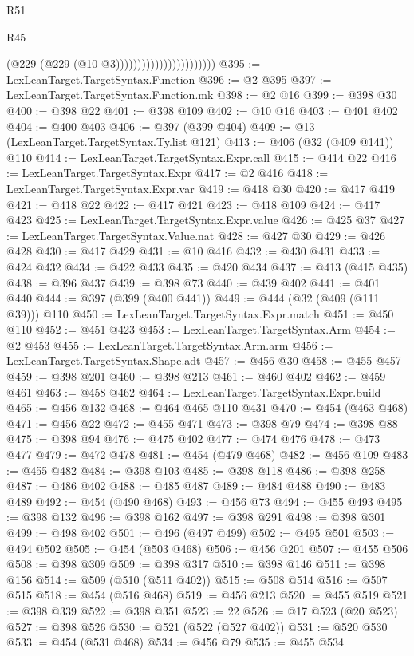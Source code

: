 \begin{lexlean}{R51}
\begin{lexlean}{R45}
\begin{coremodule}
{{{{{{{{{{{{{{{{{{{{{{{{{{{{{{{{{{{{{{{{{{{{{{{{{{{{{{{{{{{{{{{{{{{{{{{{{{{{{{{{{{{{{{{{{{{                                            (@229 (@229 (@10 @3)))))))))))))))))))))))
@395 := LexLeanTarget.TargetSyntax.Function
@396 := @2 @395
@397 := LexLeanTarget.TargetSyntax.Function.mk
@398 := @2 @16
@399 := @398 @30
@400 := @398 @22
@401 := @398 @109
@402 := @10 @16
@403 := @401 @402
@404 := @400 @403
@406 := @397 (@399 @404)
@409 := @13 (LexLeanTarget.TargetSyntax.Ty.list @121)
@413 := @406 (@32 (@409 @141)) @110
@414 := LexLeanTarget.TargetSyntax.Expr.call
@415 := @414 @22
@416 := LexLeanTarget.TargetSyntax.Expr
@417 := @2 @416
@418 := LexLeanTarget.TargetSyntax.Expr.var
@419 := @418 @30
@420 := @417 @419
@421 := @418 @22
@422 := @417 @421
@423 := @418 @109
@424 := @417 @423
@425 := LexLeanTarget.TargetSyntax.Expr.value
@426 := @425 @37
@427 := LexLeanTarget.TargetSyntax.Value.nat
@428 := @427 @30
@429 := @426 @428
@430 := @417 @429
@431 := @10 @416
@432 := @430 @431
@433 := @424 @432
@434 := @422 @433
@435 := @420 @434
@437 := @413 (@415 @435)
@438 := @396 @437
@439 := @398 @73
@440 := @439 @402
@441 := @401 @440
@444 := @397 (@399 (@400 @441))
@449 := @444 (@32 (@409 (@111 @39))) @110
@450 := LexLeanTarget.TargetSyntax.Expr.match
@451 := @450 @110
@452 := @451 @423
@453 := LexLeanTarget.TargetSyntax.Arm
@454 := @2 @453
@455 := LexLeanTarget.TargetSyntax.Arm.arm
@456 := LexLeanTarget.TargetSyntax.Shape.adt
@457 := @456 @30
@458 := @455 @457
@459 := @398 @201
@460 := @398 @213
@461 := @460 @402
@462 := @459 @461
@463 := @458 @462
@464 := LexLeanTarget.TargetSyntax.Expr.build
@465 := @456 @132
@468 := @464 @465 @110 @431
@470 := @454 (@463 @468)
@471 := @456 @22
@472 := @455 @471
@473 := @398 @79
@474 := @398 @88
@475 := @398 @94
@476 := @475 @402
@477 := @474 @476
@478 := @473 @477
@479 := @472 @478
@481 := @454 (@479 @468)
@482 := @456 @109
@483 := @455 @482
@484 := @398 @103
@485 := @398 @118
@486 := @398 @258
@487 := @486 @402
@488 := @485 @487
@489 := @484 @488
@490 := @483 @489
@492 := @454 (@490 @468)
@493 := @456 @73
@494 := @455 @493
@495 := @398 @132
@496 := @398 @162
@497 := @398 @291
@498 := @398 @301
@499 := @498 @402
@501 := @496 (@497 @499)
@502 := @495 @501
@503 := @494 @502
@505 := @454 (@503 @468)
@506 := @456 @201
@507 := @455 @506
@508 := @398 @309
@509 := @398 @317
@510 := @398 @146
@511 := @398 @156
@514 := @509 (@510 (@511 @402))
@515 := @508 @514
@516 := @507 @515
@518 := @454 (@516 @468)
@519 := @456 @213
@520 := @455 @519
@521 := @398 @339
@522 := @398 @351
@523 := 22
@526 := @17 @523 (@20 @523)
@527 := @398 @526
@530 := @521 (@522 (@527 @402))
@531 := @520 @530
@533 := @454 (@531 @468)
@534 := @456 @79
@535 := @455 @534
}}}}}}}}}}}}}}}}}}}}}}}}}}}}}}}}}}}}}}}}}}}}}}}}}}}}}}}}}}}}}}}}}}}}}}}}}}}}}}}}}}}}}}}}}}}
\end{coremodule}
\end{lexlean}
\end{lexlean}
